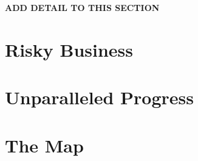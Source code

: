 \documentclass[11pt,a5paper]{book}
\begin{document}
\textbf{ADD DETAIL TO THIS SECTION}
\newpage

\section{Risky Business}
\newpage

\section{Unparalleled Progress}
\newpage

\section{The Map}





\end{document}
